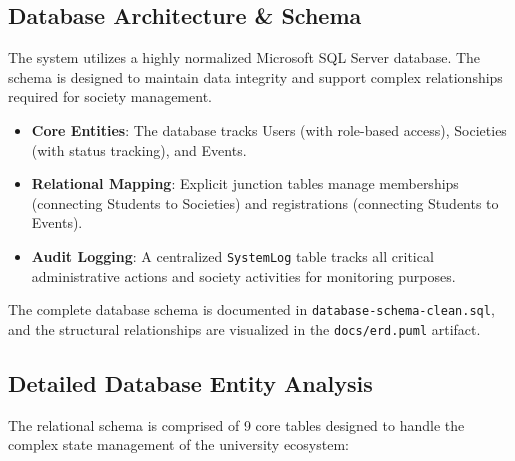 \documentclass[12pt,a4paper]{article}
\begin{document}
\subsection{Database Architecture \& Schema}
The system utilizes a highly normalized Microsoft SQL Server database. The schema is designed to maintain data integrity and support complex relationships required for society management.

\begin{itemize}
    \item \textbf{Core Entities}: The database tracks Users (with role-based access), Societies (with status tracking), and Events.
    \item \textbf{Relational Mapping}: Explicit junction tables manage memberships (connecting Students to Societies) and registrations (connecting Students to Events).
    \item \textbf{Audit Logging}: A centralized \texttt{SystemLog} table tracks all critical administrative actions and society activities for monitoring purposes.
\end{itemize}

The complete database schema is documented in \texttt{database-schema-clean.sql}, and the structural relationships are visualized in the \texttt{docs/erd.puml} artifact.

\subsection{Detailed Database Entity Analysis}
The relational schema is comprised of 9 core tables designed to handle the complex state management of the university ecosystem:
\end{document}
